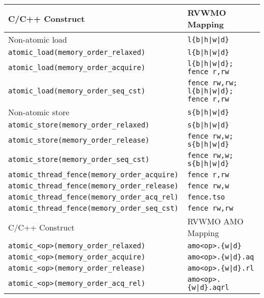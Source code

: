 \begin{table}[h!]
  \centering
  \begin{tabular}{|l|l|}
    \hline
    C/C++ Construct                            & RVWMO Mapping \\
    \hline
    \hline
    Non-atomic load                            & \tt l\{b|h|w|d\}               \\
    \hline
    \tt atomic\_load(memory\_order\_relaxed)   & \tt l\{b|h|w|d\}               \\
    \hline
    \tt atomic\_load(memory\_order\_acquire)   & \tt l\{b|h|w|d\}; fence r,rw    \\
    \hline
    \tt atomic\_load(memory\_order\_seq\_cst)  & \tt fence rw,rw; l\{b|h|w|d\}; fence r,rw       \\
    \hline
    \hline
    Non-atomic store                           & \tt s\{b|h|w|d\}               \\
    \hline
    \tt atomic\_store(memory\_order\_relaxed)  & \tt s\{b|h|w|d\}               \\
    \hline
    \tt atomic\_store(memory\_order\_release)  & \tt fence rw,w; s\{b|h|w|d\}  \\
    \hline
    \tt atomic\_store(memory\_order\_seq\_cst) & \tt fence rw,w; s\{b|h|w|d\}  \\
    \hline
    \hline
    \tt atomic\_thread\_fence(memory\_order\_acquire)  & \tt fence r,rw \\
    \hline
    \tt atomic\_thread\_fence(memory\_order\_release)  & \tt fence rw,w \\
    \hline
    \tt atomic\_thread\_fence(memory\_order\_acq\_rel) & {\tt fence.tso} \\
    \hline
    \tt atomic\_thread\_fence(memory\_order\_seq\_cst) & \tt fence rw,rw \\
    \hline
    \hline
    C/C++ Construct                           & RVWMO AMO Mapping        \\
    \hline
    \tt atomic\_<op>(memory\_order\_relaxed)  & \tt amo<op>.\{w|d\}      \\
    \hline
    \tt atomic\_<op>(memory\_order\_acquire)  & \tt amo<op>.\{w|d\}.aq   \\
    \hline
    \tt atomic\_<op>(memory\_order\_release)  & \tt amo<op>.\{w|d\}.rl   \\
    \hline
    \tt atomic\_<op>(memory\_order\_acq\_rel) & \tt amo<op>.\{w|d\}.aqrl \\

\end{tabular}
\end{table}
